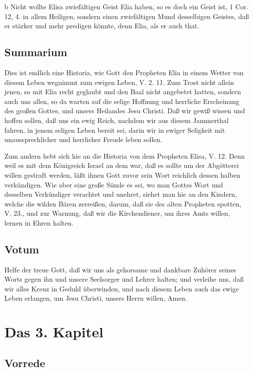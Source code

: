 b Nicht wollte Elisa zwiefältigen Geist Elia haben, so es doch ein Geist ist, 1 Cor. 12, 4. in allem Heiligen, sondern einen zwiefältigen Mund desselbigen Geistes, daß er stärker und mehr predigen könnte, denn Elia, als er auch that.

\section{Summarium}

Dies ist endlich eine Historia, wie Gott den Propheten Elia in einem Wetter von diesem Leben wegnimmt zum ewigen Leben, V. 2. 11. Zum Trost nicht allein jenen, so mit Elia recht geglaubt und den Baal nicht angebetet hatten, sondern auch uns allen, so da warten auf die selige Hoffnung und herrliche Erscheinung des großen Gottes, und unsers Heilandes Jesu Christi. Daß wir gewiß wissen und hoffen sollen, daß uns ein ewig Reich, nachdem wir aus diesem Jammerthal fahren, in jenem seligen Leben bereit sei, darin wir in ewiger Seligkeit mit unaussprechlicher und herrlicher Freude leben sollen.

Zum andern hebt sich hie an die Historia von dem Propheten Elisa, V. 12. Denn weil es mit dem Königreich Israel an dem war, daß es sollte um der Abgötterei willen gestraft werden, läßt ihnen Gott zuvor sein Wort reichlich dessen halben verkündigen. Wie aber eine große Sünde es sei, wo man Gottes Wort und desselben Verkündiger verachtet und unehret, siehet man hie an den Kindern, welche die wilden Bären zerreißen, darum, daß sie des alten Propheten spotten, V. 23., und zur Warnung, daß wir die Kirchendiener, um ihres Amts willen, lernen in Ehren halten.

\section{Votum}

Helfe der treue Gott, daß wir uns als gehorsame und dankbare Zuhörer seines Worts gegen ihn und unsere Seelsorger und Lehrer halten; und verleihe uns, daß wir alles Kreuz in Geduld überwinden, und nach diesem Leben auch das ewige Leben erlangen, um Jesu Christi, unsers Herrn willen, Amen.

\chapter{Das 3. Kapitel}

\section{Vorrede}

